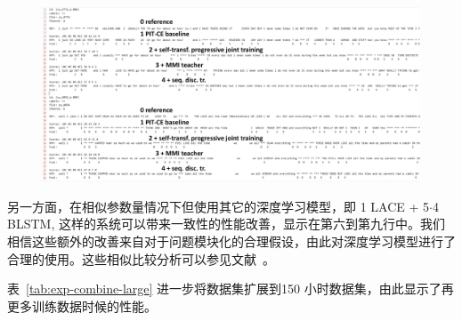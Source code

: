 \begin{figure}[!htp]
  \centering
    \captionstyle{\centering}
    \includegraphics[width=\textwidth]{figure/pit-example.pdf}
\end{figure}


另一方面，在相似参数量情况下但使用其它的深度学习模型，即 {1 LACE + 5$\cdot$4 BLSTM}, 这样的系统可以带来一致性的性能改善，显示在第六到第九行中。我们相信这些额外的改善来自对于问题模块化的合理假设，由此对深度学习模型进行了合理的使用。这些相似比较分析可以参见文献~\cite{chen2018progressive}。



表~\ref{tab:exp-combine-large} 进一步将数据集扩展到150 小时数据集，由此显示了再更多训练数据时候的性能。

